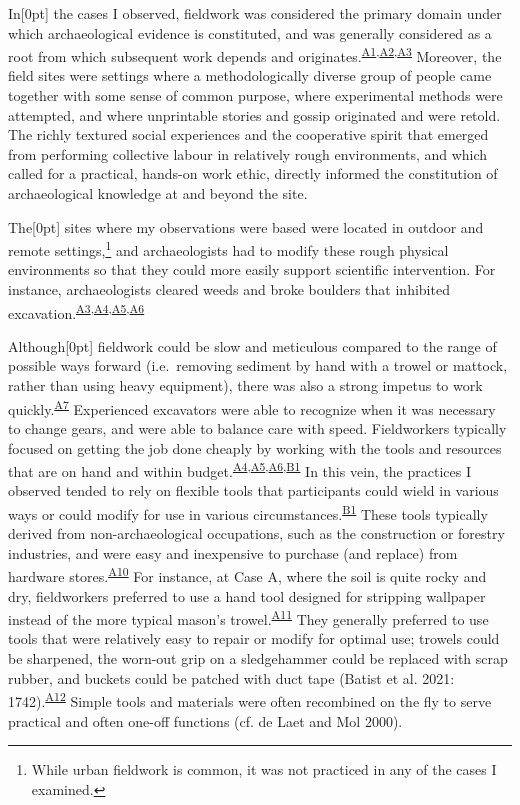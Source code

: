 \documentclass[
]{article}
\newcommand{\paragraphnumber}[1]{\marginnote{\color{lightgray}\tiny{#1}}[0pt]}
\begin{document}
In\paragraphnumber{[43]} the cases I observed, fieldwork was considered
the primary domain under which archaeological evidence is constituted,
and was generally considered as a root from which subsequent work
depends and
originates.\textsuperscript{\hyperref[sec-A1]{A1},\hyperref[sec-A2]{A2},\hyperref[sec-A3]{A3}}
Moreover, the field sites were settings where a methodologically diverse
group of people came together with some sense of common purpose, where
experimental methods were attempted, and where unprintable stories and
gossip originated and were retold. The richly textured social
experiences and the cooperative spirit that emerged from performing
collective labour in relatively rough environments, and which called for
a practical, hands-on work ethic, directly informed the constitution of
archaeological knowledge at and beyond the site.

The\paragraphnumber{[44]} sites where my observations were based were
located in outdoor and remote settings,\footnote{While urban fieldwork
  is common, it was not practiced in any of the cases I examined.} and
archaeologists had to modify these rough physical environments so that
they could more easily support scientific intervention. For instance,
archaeologists cleared weeds and broke boulders that inhibited
excavation.\textsuperscript{\hyperref[sec-A3]{A3},\hyperref[sec-A4]{A4},\hyperref[sec-A5]{A5},\hyperref[sec-A6]{A6}}

Although\paragraphnumber{[45]} fieldwork could be slow and meticulous
compared to the range of possible ways forward (i.e.~removing sediment
by hand with a trowel or mattock, rather than using heavy equipment),
there was also a strong impetus to work
quickly.\textsuperscript{\hyperref[sec-A7]{A7}} Experienced excavators
were able to recognize when it was necessary to change gears, and were
able to balance care with speed. Fieldworkers typically focused on
getting the job done cheaply by working with the tools and resources
that are on hand and within
budget.\textsuperscript{\hyperref[sec-A4]{A4},\hyperref[sec-A8]{A5},\hyperref[sec-A9]{A6},\hyperref[sec-B1]{B1}}
In this vein, the practices I observed tended to rely on flexible tools
that participants could wield in various ways or could modify for use in
various circumstances.\textsuperscript{\hyperref[sec-B1]{B1}} These
tools typically derived from non-archaeological occupations, such as the
construction or forestry industries, and were easy and inexpensive to
purchase (and replace) from hardware
stores.\textsuperscript{\hyperref[sec-A10]{A10}} For instance, at Case
A, where the soil is quite rocky and dry, fieldworkers preferred to use
a hand tool designed for stripping wallpaper instead of the more typical
mason's trowel.\textsuperscript{\hyperref[sec-A11]{A11}} They generally
preferred to use tools that were relatively easy to repair or modify for
optimal use; trowels could be sharpened, the worn-out grip on a
sledgehammer could be replaced with scrap rubber, and buckets could be
patched with duct tape (Batist et al. 2021:
1742).\textsuperscript{\hyperref[sec-A12]{A12}} Simple tools and
materials were often recombined on the fly to serve practical and often
one-off functions (cf. de Laet and Mol 2000).
\end{document}
